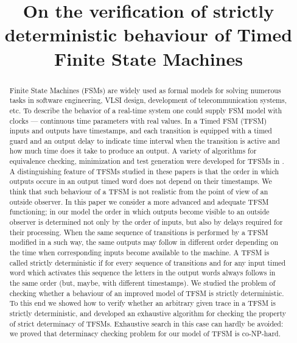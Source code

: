 \documentclass[conference]{IEEEtran}
\begin{document}
\title{On the verification of strictly deterministic behaviour of Timed Finite State Machines}

\author
{
\and
{}
}

\maketitle

\begin{abstract}
	Finite State Machines (FSMs) are widely used as formal models for solving numerous tasks in software engineering, VLSI design, development of telecommunication systems, etc. To describe the behavior of a real-time system one could supply FSM model with clocks --- continuous time parameters with real values. In a Timed FSM (TFSM) inputs and outputs have timestamps, and each transition is equipped with a timed guard and an output delay to indicate time interval when the transition is active and how much time does it take to produce an output. A variety of algorithms for equivalence checking, minimization and test generation were developed for TFSMs in \cite{timed_fsm,timed_guard, tvar, zig}. A distinguishing feature of TFSMs studied in these papers is that the order in which outputs occure in an output timed word does not depend on their timestamps. We think that such behaviour of a TFSM is not realistic from the point of view of an outside observer. In this paper we consider a more advanced and adequate TFSM functioning; in our model the order in which outputs become visible to an outside observer is determined not only by the order of inputs, but also by delays required for their processing. When the same sequence of transitions is performed by a TFSM modified in a such way, the same outputs may follow in different order depending on the time when corresponding inputs become available to the machine. A TFSM is called strictly deterministic if for every sequence of transitions and for any input timed word which activates this sequence the letters in the output words always follows in the same order (but, maybe, with different timestamps). We studied the problem of checking whether a behaviour of an improved model of TFSM is strictly deterministic. To this end we showed how to verify whether an arbitrary given trace in a TFSM is strictly deterministic, and developed an exhaustive algorithm for checking the property of strict determinacy of TFSMs. Exhaustive search in this case can hardly be avoided: we proved that determinacy checking problem for our model of TFSM is co-NP-hard.
\end{abstract}
\end{document}
